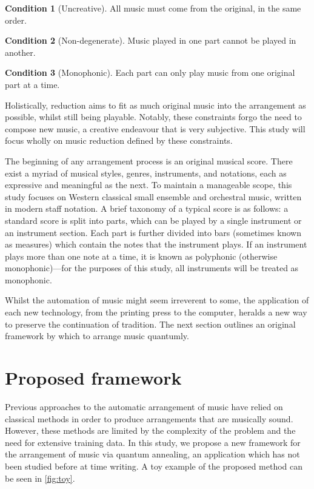 \documentclass[12pt]{article}
\theoremstyle{definition}
\newtheorem{condition}{Condition}
\begin{document}
\begin{condition}[Uncreative]
    All music must come from the original, in the same order.
    \label{con:uncreative}
\end{condition}
\begin{condition}[Non-degenerate]
    Music played in one part cannot be played in another.
    \label{con:non-degenerate}
\end{condition}
\begin{condition}[Monophonic]
    Each part can only play music from one original part at a time.
    \label{con:monophonic}
\end{condition}

Holistically, reduction aims to fit as much original music into the arrangement as possible, whilst still being playable. Notably, these constraints forgo the need to compose new music, a creative endeavour that is very subjective. This study will focus wholly on music reduction defined by these constraints.

The beginning of any arrangement process is an original musical score. There exist a myriad of musical styles, genres, instruments, and notations, each as expressive and meaningful as the next. To maintain a manageable scope, this study focuses on Western classical small ensemble and orchestral music, written in modern staff notation. A brief taxonomy of a typical score is as follows: a standard score is split into parts, which can be played by a single instrument or an instrument section. Each part is further divided into bars (sometimes known as measures) which contain the notes that the instrument plays. If an instrument plays more than one note at a time, it is known as polyphonic (otherwise monophonic)---for the purposes of this study, all instruments will be treated as monophonic.

Whilst the automation of music might seem irreverent to some, the application of each new technology, from the printing press to the computer, heralds a new way to preserve the continuation of tradition. The next section outlines an original framework by which to arrange music quantumly.

\section{Proposed framework}

Previous approaches to the automatic arrangement of music have relied on classical methods in order to produce arrangements that are musically sound. However, these methods are limited by the complexity of the problem and the need for extensive training data. In this study, we propose a new framework for the arrangement of music via quantum annealing, an application which has not been studied before at time writing. A toy example of the proposed method can be seen in \cref{fig:toy}.
\end{document}
